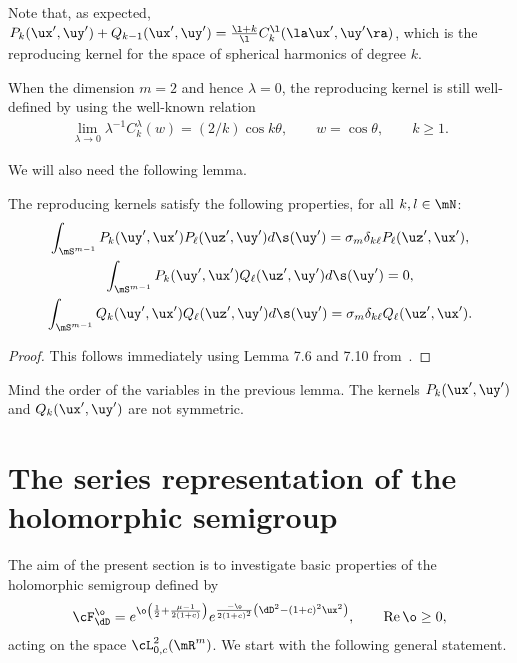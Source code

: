 \begin{remark}
Note that, as expected, $P_{k}(\ux',\uy')+Q_{k-1}(\ux',\uy')=
\frac{\l+k}{\l}C_{k}^{\l}(\la\ux',\uy'\ra)$, which is the reproducing kernel for the space of
spherical harmonics of degree $k$.
\end{remark}

\begin{remark}
When the dimension $m=2$ and hence $\lambda=0$, the reproducing kernel is still well-def\/ined by
using the well-known relation~\cite[(4.7.8)]{Sz}
\begin{gather*}
\lim_{\lambda\rightarrow0}\lambda^{-1}C_k^\lambda(w)=(2/k)\cos k\theta,\qquad w=\cos
\theta,\qquad k\geq1.
\end{gather*}
\end{remark}

We will also need the following lemma.

\begin{lemma}
\label{ReprKernOrth}
The reproducing kernels satisfy the following properties, for all $k,l\in\mN$:
\begin{gather*}
\int_{\mS^{m-1}} P_{k}(\uy', \ux') P_{\ell}(\uz', \uy') d \s (\uy') = \sigma_m \delta_{k \ell
}P_{\ell}( \uz', \ux'),\\
\int_{\mS^{m-1}} P_{k}( \uy', \ux') Q_{\ell}( \uz', \uy') d \s (\uy') = 0,\\
\int_{\mS^{m-1}} Q_{k}( \uy', \ux') Q_{\ell}(\uz', \uy') d \s (\uy') = \sigma_m \delta_{k \ell }
Q_{\ell}(\uz', \ux').
\end{gather*}
\end{lemma}

\begin{proof}
This follows immediately using Lemma 7.6 and 7.10 from~\cite{DBXu}.
\end{proof}

\begin{remark}
Mind the order of the variables in the previous lemma.
The kernels $P_{k}(\ux',\uy')$ and $Q_{k}(\ux',\uy')$ are not symmetric.
\end{remark}

\section{The series representation of the holomorphic semigroup}\label{section6}

The aim of the present section is to investigate basic properties of the holomorphic semigroup
def\/ined by
\begin{gather*}
\cF_{\dD}^{\o}=e^{\o\left(\frac{1}{2}+\frac{\mu-1}{2(1+c)}\right)}e^{\frac{-\o}{
2(1+c)^{2}}\left(\dD^{2}-(1+c)^{2}\ux^{2}\right)},\qquad\operatorname{Re}\o\geq0,
\end{gather*}
acting on the space $\cL^{2}_{0,c}(\mR^{m})$.
We start with the following general statement.

